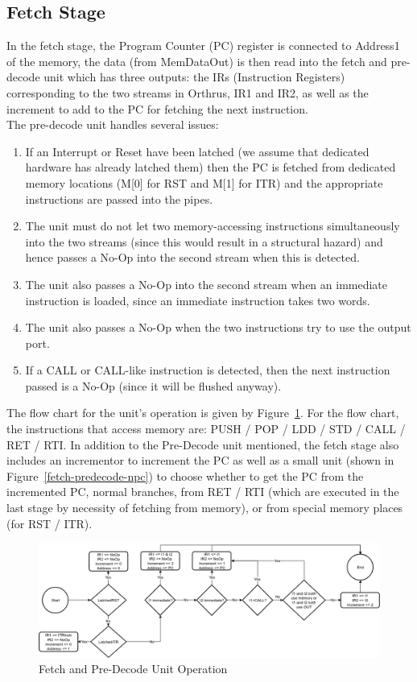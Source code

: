 \documentclass[12pt]{article}
\theoremstyle{plain}
\theoremstyle{definition}
\begin{document}
\subsection{Fetch Stage}
In the fetch stage, the Program Counter (PC) register is connected to Address1 of the memory, the data (from MemDataOut) is then read into the fetch and pre-decode unit which has three outputs: the IRs (Instruction Registers) corresponding to the two streams in Orthrus, IR1 and IR2, as well as the increment to add to the PC for fetching the next instruction. \\
The pre-decode unit handles several issues:
\begin{enumerate}
    \item If an Interrupt or Reset have been latched (we assume that dedicated hardware has already latched them) then the PC is fetched from dedicated memory locations (M[0] for RST and M[1] for ITR) and the appropriate instructions are passed into the pipes.
    \item The unit must do not let two memory-accessing instructions simultaneously into the two streams (since this would result in a structural hazard) and hence passes a No-Op into the second stream when this is detected.
    \item The unit also passes a No-Op into the second stream when an immediate instruction is loaded, since an immediate instruction takes two words.
    \item The unit also passes a No-Op when the two instructions try to use the output port. 
    \item If a CALL or CALL-like instruction is detected, then the next instruction passed is a No-Op (since it will be flushed anyway).
\end{enumerate}
The flow chart for the unit's operation is given by Figure~\ref{fetch-pre-decode-unit}. For the flow chart, the instructions that access memory are: PUSH / POP / LDD / STD / CALL / RET / RTI. In addition to the Pre-Decode unit mentioned, the fetch stage also includes an incrementor to increment the PC as well as a small unit (shown in Figure~\ref{fetch-predecode-npc}) to choose whether to get the PC from the incremented PC, normal branches, from RET / RTI (which are executed in the last stage by necessity of fetching from memory), or from special memory places (for RST / ITR).

\begin{figure}
    \centering
    \includegraphics[width=\textwidth]{Diagrams/fetch_predecode_su}
    \caption{Fetch and Pre-Decode Unit Operation}
    \label{fetch-pre-decode-unit}
\end{figure}
\end{document}

